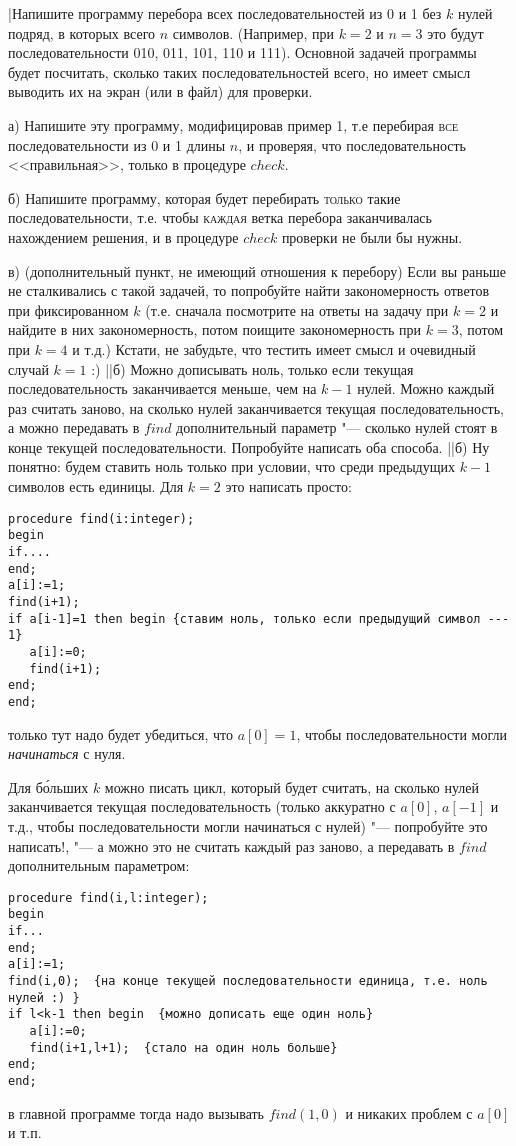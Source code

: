 \task|Напишите программу перебора всех последовательностей из 0 и 1 без $k$ 
нулей подряд, в которых всего $n$ символов. (Например, при $k=2$ и $n=3$ это будут 
последовательности 010, 011, 101, 110 и 111). Основной задачей программы будет посчитать, 
сколько таких последовательностей всего, но имеет смысл выводить их на экран (или в 
файл) для проверки.\par
а) Напишите эту программу, модифицировав пример 1, т.е перебирая \textsc{все} 
последовательности из 0 и 1 длины $n$, и проверяя, что последовательность 
<<правильная>>, только в процедуре $check$.\par
б) Напишите программу, которая будет перебирать \textsc{только} такие 
последовательности, т.е. чтобы \textsc{каждая} ветка перебора заканчивалась 
нахождением решения, и в процедуре $check$ проверки не были бы нужны.\par
в) (дополнительный пункт, не имеющий отношения к перебору) Если вы раньше не сталкивались с такой задачей, то
попробуйте найти закономерность ответов при фиксированном $k$ (т.е. сначала
посмотрите на ответы на задачу при $k=2$ и найдите в них закономерность, потом
поищите закономерность при $k=3$, потом при $k=4$ и т.д.) Кстати, не забудьте, что 
тестить имеет смысл и очевидный случай $k=1$ :)
||б) Можно дописывать ноль, только если текущая последовательность заканчивается меньше, чем на $k-1$ нулей. Можно каждый раз считать заново, на сколько нулей заканчивается текущая последовательность, а можно передавать в $find$ дополнительный параметр "--- 
сколько нулей стоят в конце текущей последовательности. Попробуйте 
написать оба способа.
||б) Ну понятно: будем ставить ноль только при условии, что среди предыдущих $k-1$ символов есть единицы.
Для $k=2$ это написать просто:
\begin{codesampleo}\begin{verbatim}
procedure find(i:integer);
begin
if....
end;
a[i]:=1;
find(i+1);
if a[i-1]=1 then begin {ставим ноль, только если предыдущий символ --- 1}
   a[i]:=0;
   find(i+1);
end;
end;
\end{verbatim}
\end{codesampleo}
только тут надо будет убедиться, что $a[0]=1$, чтобы последовательности могли \textit{начинаться} с нуля.

Для б\'{о}льших $k$ можно писать цикл, который будет считать, на сколько нулей заканчивается текущая последовательность (только аккуратно с $a[0]$, $a[-1]$ и т.д., чтобы 
последовательности могли начинаться с нулей) "--- попробуйте это написать!, "--- а можно это не считать каждый раз заново, а передавать в $find$ дополнительным параметром:
\begin{codesampleo}\begin{verbatim}
procedure find(i,l:integer);
begin
if...
end;
a[i]:=1;
find(i,0);  {на конце текущей последовательности единица, т.е. ноль нулей :) }
if l<k-1 then begin  {можно дописать еще один ноль}
   a[i]:=0;
   find(i+1,l+1);  {стало на один ноль больше}
end;
end;
\end{verbatim}
\end{codesampleo}
в главной программе тогда надо вызывать $find(1,0)$ и никаких проблем с $a[0]$ и т.п.

